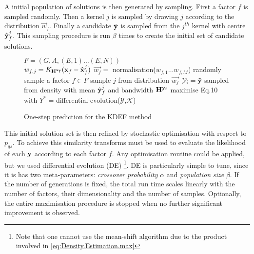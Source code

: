 A initial population of solutions is then generated by sampling. First a factor $f$ is sampled randomly. Then a kernel $j$ is sampled by drawing $j$ according to the distribution $\vec{w}_f$. Finally a candidate $\tilde{\mathbf{y}}$ is sampled from the $j^{th}$ kernel with centre $\hat{\mathbf{y}}^j_f$. This sampling procedure is run $\beta$ times to create the initial set of candidate solutions.
\begin{figure}
\begin{center}
\begin{algorithmic}
\STATE $F = (G, A, (E,1) \ldots (E,N))$  \\
\STATE $w_{f,j} = K_{\mathbf{H^{\mathbf{x}_f}}}(\mathbf{x}_f - \hat{\mathbf{x}}_f^j)$
\ENDFOR
\STATE $\vec{w_f} =$ normalisation($w_{f,1} \ldots w_{f,M}$)
\ENDFOR
{}
\STATE randomly sample a factor $f\in F$ 
\STATE sample $j$ from distribution $\vec{w_f}$
\STATE  $\mathcal{Y}_i = \tilde{\mathbf{y}}$ sampled from density with mean $\hat{\mathbf{y}}^j_f$ and bandwidth $\mathbf{H^{\mathbf{y}_f}}$
\ENDFOR
\STATE maximise Eq.10 with $Y^*$ = differential-evolution($\mathcal{Y}$,$\mathcal{K}$) 
\end{algorithmic}
\caption{\label{alg:prediction}One-step prediction for the KDEF method}
\end{center}
\end{figure}

This initial solution set is then refined by stochastic optimisation with respect to $p_{qs}$. To achieve this similarity transforms must be used to evaluate the likelihood of each $\mathbf{y}$ according to each factor $f$. Any optimisation routine could be applied, but we used differential evolution (DE) \citep{storn_differential_1997}\footnote{Note that one cannot use the mean-shift algorithm \citep{cheng_mean_1995}
due to the product involved in \eqref{eq:Density.Estimation.max}}.
DE is particularly simple to tune, since it is has two meta-parameters: \textit{crossover probability} $\alpha$ and \textit{population size} $\beta$. If the number of generations is fixed, the total run time scales linearly with the number of factors, their dimensionality and the number of samples. Optionally, the entire maximisation procedure is stopped when no further significant improvement is observed. 

